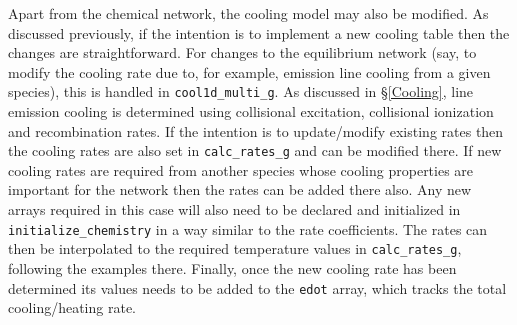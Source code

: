 Apart from the chemical network, the cooling model may also be
modified. As discussed previously, if the intention is to implement a
new cooling table then the changes are straightforward.  For changes
to the equilibrium network (say, to modify the cooling rate due to, for
example, emission line cooling from a given species), this is handled
in \texttt{cool1d\_multi\_g}. As discussed in \S \ref{Cooling}, line
emission cooling is determined using collisional excitation,
collisional ionization and recombination rates. If the intention is to
update/modify existing rates then the cooling rates are also set in
\texttt{calc\_rates\_g} and can be modified there. If new cooling
rates are required from another species whose cooling properties are
important for the network then the rates can be added there also. Any
new arrays required in this case will also need to be declared and
initialized in \texttt{initialize\_chemistry} in a way similar to the
rate coefficients. The rates can then be interpolated to the required
temperature values in \texttt{calc\_rates\_g}, following the examples
there. Finally, once the new cooling rate has been determined its
values needs to be added to the \texttt{edot} array, which tracks
the total cooling/heating rate.
